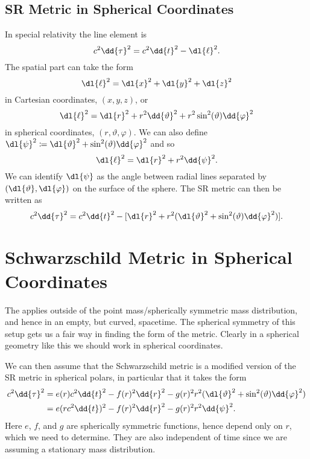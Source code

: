 \documentclass[fleqn]{NotesClass}
\begin{document}
    \subsection{SR Metric in Spherical Coordinates}
    In special relativity the line element is
    \begin{equation}
        c^2\dd{\tau}^2 = c^2\dd{t}^2 - \dl{\ell}^2.
    \end{equation}
    The spatial part can take the form
    \begin{equation}
        \dl{\ell}^2 = \dl{x}^2 + \dl{y}^2 + \dl{z}^2
    \end{equation}
    in Cartesian coordinates, \((x, y, z)\), or
    \begin{equation}
        \dl{\ell}^2 = \dl{r}^2 + r^2 \dd{\vartheta}^2 + r^2\sin^2(\vartheta) \dd{\varphi}^2
    \end{equation}
    in spherical coordinates, \((r, \vartheta, \varphi)\).
    We can also define \(\dl{\psi}^2 \coloneqq \dl{\vartheta}^2 + \sin^2(\vartheta) \dd{\varphi}^2\) and so
    \begin{equation}
        \dl{\ell}^2 = \dl{r}^2 + r^2 \dd{\psi}^2.
    \end{equation}
    We can identify \(\dl{\psi}\) as the angle between radial lines separated by \((\dl{\vartheta}, \dl{\varphi})\) on the surface of the sphere.
    The SR metric can then be written as
    \begin{equation}
        c^2\dd{\tau}^2 = c^2\dd{t}^2 - [\dl{r}^2 + r^2(\dl{\vartheta}^2 + \sin^2(\vartheta) \dd{\varphi}^2)].
    \end{equation}
    
    \section{Schwarzschild Metric in Spherical Coordinates}
    The  applies outside of the point mass/spherically symmetric mass distribution, and hence in an empty, but curved, spacetime.
    The spherical symmetry of this setup gets us a fair way in finding the form of the metric.
    Clearly in a spherical geometry like this we should work in spherical coordinates.
    
    We can then assume that the Schwarzschild metric is a modified version of the SR metric in spherical polars, in particular that it takes the form
    \begin{align}
        c^2\dd{\tau}^2 &= e(r)c^2\dd{t}^2 - f(r)^2\dd{r}^2 - g(r)^2 r^2(\dl{\vartheta}^2 + \sin^2(\vartheta)\dd{\varphi}^2)\\
        &= e(rc^2\dd{t})^2 - f(r)^2\dd{r}^2 - g(r)^2 r^2 \dd{\psi}^2.
    \end{align}
    Here \(e\), \(f\), and \(g\) are spherically symmetric functions, hence depend only on \(r\), which we need to determine.
    They are also independent of time since we are assuming a stationary mass distribution.
    
\end{document}
